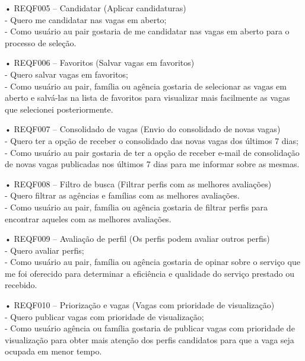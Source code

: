 • REQF005 – Candidatar (Aplicar candidaturas)
\\ - Quero me candidatar nas vagas em aberto;
\\ - Como usuário au pair gostaria de me candidatar nas vagas em aberto para o processo de seleção.

• REQF006 – Favoritos (Salvar vagas em favoritos)
\\ - Quero salvar vagas em favoritos;
\\ - Como usuário au pair, família ou agência gostaria de selecionar as vagas em aberto e salvá-las na lista de favoritos para visualizar mais facilmente as vagas que selecionei posteriormente.

• REQF007 – Consolidado de vagas (Envio do consolidado de novas vagas)
\\ - Quero ter a opção de receber o consolidado das novas vagas dos últimos 7 dias;
\\ - Como usuário au pair gostaria de ter a opção de receber e-mail de consolidação de novas vagas publicadas nos últimos 7 dias para me informar sobre as mesmas. 

• REQF008 – Filtro de busca (Filtrar perfis com as melhores avaliações)
\\ - Quero filtrar as agências e famílias com as melhores avaliações.
\\ - Como usuário au pair, família ou agência gostaria de filtrar perfis para encontrar aqueles com as melhores avaliações.

• REQF009 – Avaliação de perfil (Os perfis podem avaliar outros perfis)
\\ - Quero avaliar perfis;
\\-  Como usuário au pair, família ou agência gostaria de opinar sobre o serviço que me foi oferecido para determinar a eficiência e qualidade do serviço prestado ou recebido. 

• REQF010 – Priorização e vagas (Vagas com prioridade de visualização)
\\ - Quero publicar vagas com prioridade de visualização;
\\ - Como usuário agência ou família gostaria de publicar vagas com prioridade de visualização para obter mais atenção dos perfis candidatos para que a vaga seja ocupada em menor tempo.  



